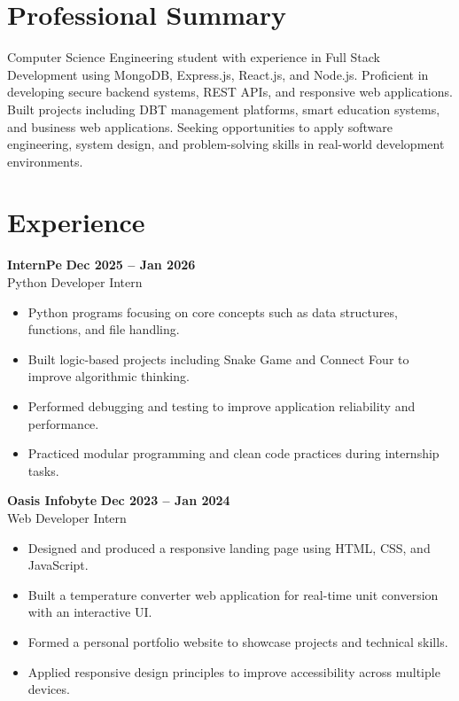 \documentclass[a4paper,10pt]{article}
\begin{document}
\begin{minipage}[t]{0.63\textwidth}
\raggedright

\section*{Professional Summary}
Computer Science Engineering student with experience in Full Stack Development using MongoDB, Express.js, React.js, and Node.js. Proficient in developing secure backend systems, REST APIs, and responsive web applications. Built projects including DBT management platforms, smart education systems, and business web applications. Seeking opportunities to apply software engineering, system design, and problem-solving skills in real-world development environments.

\section*{Experience}
\textbf{InternPe} \hfill \textbf{Dec 2025 -- Jan 2026} \\
Python Developer Intern
\begin{itemize}
  \item Python programs focusing on core concepts such as data structures, functions, and file handling.
  \item Built logic-based projects including Snake Game and Connect Four to improve algorithmic thinking.
  \item Performed debugging and testing to improve application reliability and performance.
  \item Practiced modular programming and clean code practices during internship tasks.
\end{itemize}

\vspace{1mm}
\textbf{Oasis Infobyte} \hfill \textbf{Dec 2023 -- Jan 2024} \\
Web Developer Intern
\begin{itemize}
  \item Designed and produced a responsive landing page using HTML, CSS, and JavaScript.
  \item Built a temperature converter web application for real-time unit conversion with an interactive UI.
  \item Formed a personal portfolio website to showcase projects and technical skills.
  \item Applied responsive design principles to improve accessibility across multiple devices.
\end{itemize}



\end{minipage}
\end{document}
